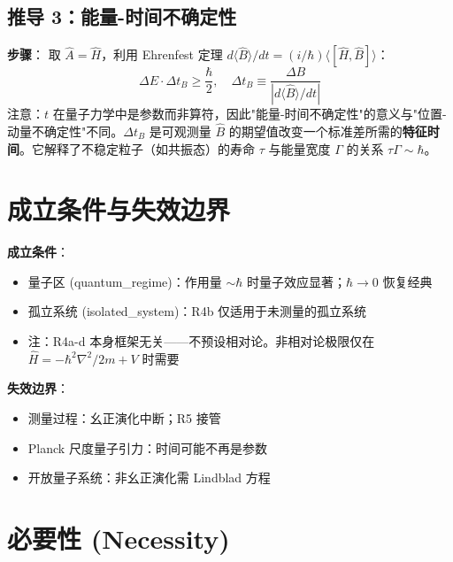 \subsection{推导 3：能量-时间不确定性}

\textbf{步骤}：\fbox{[S]} 取 $\hat{A} = \hat{H}$，利用 Ehrenfest 定理 $d\langle\hat{B}\rangle/dt = (i/\hbar)\langle[\hat{H},\hat{B}]\rangle$：
\begin{equation}
\Delta E \cdot \Delta t_B \ge \frac{\hbar}{2}, \quad
\Delta t_B \equiv \frac{\Delta B}{|d\langle\hat{B}\rangle/dt|}
\end{equation}
\fbox{[N]} 注意：$t$ 在量子力学中是参数而非算符，因此"能量-时间不确定性"的意义与"位置-动量不确定性"不同。$\Delta t_B$ 是可观测量 $\hat{B}$ 的期望值改变一个标准差所需的\textbf{特征时间}。它解释了不稳定粒子（如共振态）的寿命 $\tau$ 与能量宽度 $\Gamma$ 的关系 $\tau\Gamma \sim \hbar$。

\section{成立条件与失效边界}

\begin{limitbox}[R4 的成立条件与失效边界]
  \textbf{成立条件}：
  \begin{itemize}
    \item 量子区 (quantum\_regime)：作用量 $\sim \hbar$ 时量子效应显著；$\hbar \to 0$ 恢复经典
    \item 孤立系统 (isolated\_system)：R4b 仅适用于未测量的孤立系统
    \item 注：R4a-d 本身框架无关——不预设相对论。非相对论极限仅在 $\hat{H} = -\hbar^2\nabla^2/2m + V$ 时需要
  \end{itemize}

  \textbf{失效边界}：
  \begin{itemize}
    \item 测量过程：幺正演化中断；R5 接管
    \item Planck 尺度量子引力：时间可能不再是参数
    \item 开放量子系统：非幺正演化需 Lindblad 方程
  \end{itemize}
\end{limitbox}

\section{必要性 (Necessity)}

